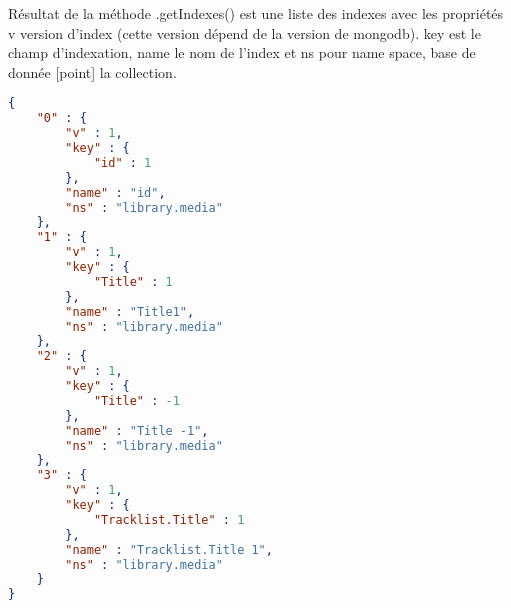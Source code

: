 Résultat de la méthode .getIndexes() est une liste des indexes avec les propriétés v version d’index (cette version dépend de la version de mongodb). key est le champ d’indexation, name le nom de l’index et ns pour name space, base de donnée [point] la collection.

\begin{lstlisting}[language=JSON, caption=Résultat de la méthode .getIndexes()]
{
    "0" : {
        "v" : 1,
        "key" : {
            "id" : 1
        },
        "name" : "id",
        "ns" : "library.media"
    },
    "1" : {
        "v" : 1,
        "key" : {
            "Title" : 1
        },
        "name" : "Title1",
        "ns" : "library.media"
    },
    "2" : {
        "v" : 1,
        "key" : {
            "Title" : -1
        },
        "name" : "Title -1",
        "ns" : "library.media"
    },
    "3" : {
        "v" : 1,
        "key" : {
            "Tracklist.Title" : 1
        },
        "name" : "Tracklist.Title 1",
        "ns" : "library.media"
    }
}
\end{lstlisting}